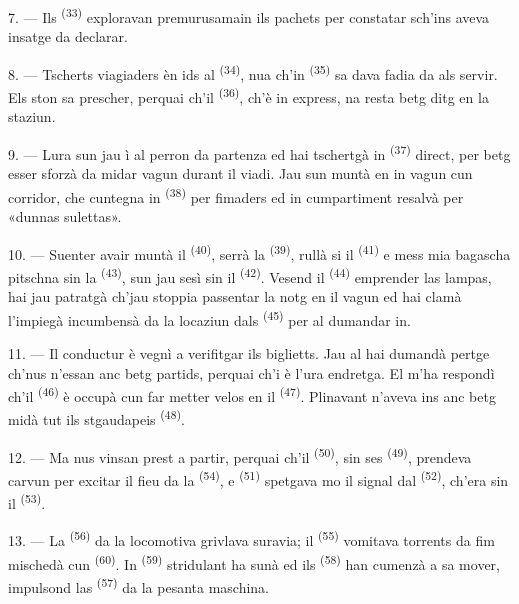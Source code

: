 7. --- Ils  \textsuperscript{(33)} exploravan premurusamain
ils pachets per constatar sch'ins aveva insatge da declarar.

8. --- Tscherts viagiaders èn ids al  \textsuperscript{(34)}, nua ch'in
 \textsuperscript{(35)} sa dava fadia da als servir. Els ston sa prescher,
perquai ch'il  \textsuperscript{(36)}, ch'è in express, na resta betg ditg en
la staziun.

9. --- Lura sun jau ì al perron da partenza ed hai tschertgà in 
\textsuperscript{(37)} direct, per betg esser sforzà da midar vagun durant il viadi. Jau
sun muntà en in vagun cun corridor, che cuntegna in 
\textsuperscript{(38)} per fimaders ed in cumpartiment resalvà per «dunnas sulettas».

\VUsaut{3.0mm}

10. --- Suenter avair muntà il  \textsuperscript{(40)}, serrà la
 \textsuperscript{(39)}, rullà si il 
\textsuperscript{(41)} e mess mia bagascha pitschna sin la 
\textsuperscript{(43)}, sun jau sesì sin il
 \textsuperscript{(42)}. Vesend il  \textsuperscript{(44)} emprender
las lampas, hai jau patratgà ch'jau stoppia passentar la notg en il vagun ed hai
clamà l'impiegà incumbensà da la locaziun dals 
\textsuperscript{(45)} per al dumandar in.

11. --- Il conductur è vegnì a verifitgar ils biglietts. Jau al hai dumandà pertge
ch'nus n'essan anc betg partids, perquai ch'i è l'ura endretga. El m'ha respondì ch'il
 \textsuperscript{(46)} è occupà cun far metter velos en il 
\textsuperscript{(47)}. Plinavant n'aveva ins anc betg midà tut ils stgaudapeis
\textsuperscript{(48)}.

12. --- Ma nus vinsan prest a partir, perquai ch'il 
\textsuperscript{(50)}, sin ses  \textsuperscript{(49)}, prendeva carvun per
excitar il fieu da la  \textsuperscript{(54)}, e 
\textsuperscript{(51)} spetgava mo il signal dal 
\textsuperscript{(52)}, ch'era sin il  \textsuperscript{(53)}.

13. --- La  \textsuperscript{(56)} da la locomotiva grivlava suravia; il
 \textsuperscript{(55)} vomitava torrents da fim mischedà cun 
\textsuperscript{(60)}. In  \textsuperscript{(59)} stridulant ha sunà ed ils
 \textsuperscript{(58)} han cumenzà a sa mover, impulsond las 
\textsuperscript{(57)} da la pesanta maschina.

